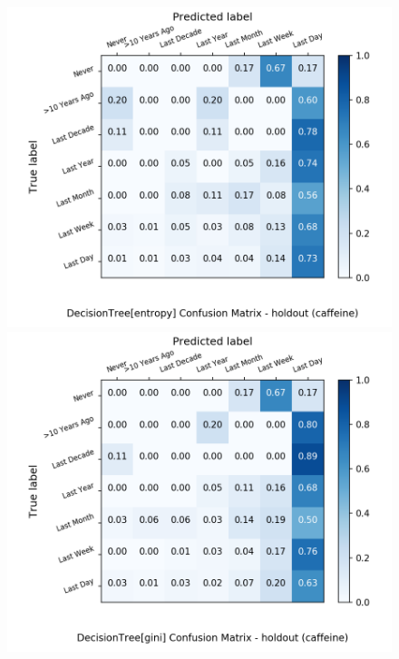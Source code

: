 \begin{figure}[H]
	\centering
	\begin{minipage}[b]{0.32\textwidth}
		\includegraphics[width=1.1\textwidth]{Plots/caffeine_DecisionTree_entropy_balance_False_holdout.png}
	\end{minipage}
	\begin{minipage}[b]{0.32\textwidth}
		\includegraphics[width=1.1\textwidth]{Plots/caffeine_DecisionTree_gini_balance_False_holdout.png}
	\end{minipage}
	\begin{minipage}[b]{0.32\textwidth}

\end{minipage}
\end{figure}
